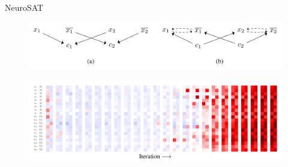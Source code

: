 \documentclass[14pt,aspectratio=169,hyperref={pdftex,unicode},xcolor=dvipsnames]{beamer}
\begin{document}
\begin{frame}[noframenumbering]{NeuroSAT \cite{neurosat-paper}}

\begin{center}

\begin{figure}[ht]
\begin{center}
  \includegraphics[scale=0.2]{./assets/neurosat-mpnn.png}
\end{center}
\end{figure}

\begin{figure}[ht]
\begin{center}
  \includegraphics[scale=0.175]{./assets/neurosat-voting.png}
\end{center}
\end{figure}

\end{center}

\end{frame}
\end{document}
